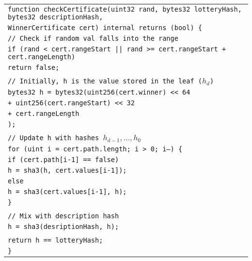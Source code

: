 \documentclass[a4paper]{article}
\begin{document}
    \begin{center}
        \begin{tabular}{l}
            \texttt{function checkCertificate(uint32 rand, bytes32 lotteryHash, bytes32 descriptionHash, }\\
            \qquad\qquad\qquad\qquad\qquad\qquad\qquad \texttt{WinnerCertificate cert) internal returns (bool) \{ }\\
            \qquad \texttt{// Check if random val falls into the range}\\
            \qquad \texttt{if (rand < cert.rangeStart || rand >= cert.rangeStart + cert.rangeLength)}\\
            \qquad\qquad \texttt{return false;}\\
            \\
            \qquad\texttt{// Initially, h is the value stored in the leaf ($h_d$)}\\
            \qquad \texttt{bytes32 h = bytes32(uint256(cert.winner) << 64}\\
            \qquad\qquad\qquad\qquad \texttt{+ uint256(cert.rangeStart) << 32}\\
            \qquad\qquad\qquad\qquad \texttt{+ cert.rangeLength}\\
            \qquad\qquad\qquad\qquad \texttt{);}\\
            \\
            \qquad \texttt{// Update h with hashes $h_{d-1}, \ldots, h_0$}\\
            \qquad\texttt{for (uint i = cert.path.length; i > 0; i--) \{}\\
            \qquad\qquad \texttt{if (cert.path[i-1] == false)}\\
            \qquad\qquad\qquad \texttt{h = sha3(h, cert.values[i-1]);}\\
            \qquad\qquad \texttt{else}\\
            \qquad\qquad\qquad\texttt{h = sha3(cert.values[i-1], h);}\\
            \qquad\texttt{\}}\\
            \\
            \qquad\texttt{// Mix with description hash}\\
            \qquad\texttt{h = sha3(desriptionHash, h);}\\
            \\
            \qquad\texttt{return h == lotteryHash;}\\
            \texttt{\}}
        \end{tabular}
    \end{center}
\end{document}
